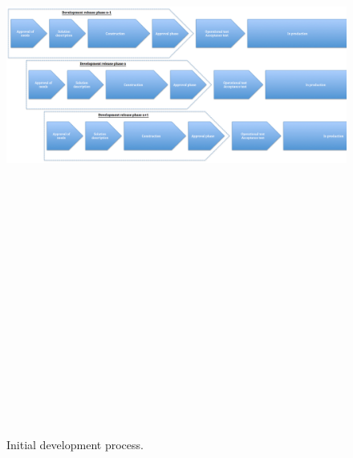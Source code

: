 \begin{figure}[H]
\centering
\includegraphics[angle=90, trim = 0mm 0mm 20mm 0mm,width=160mm, height=230mm]{images/initial_development_process}
\caption{Initial development process.}
\label{initial_development_process}
\end{figure}

